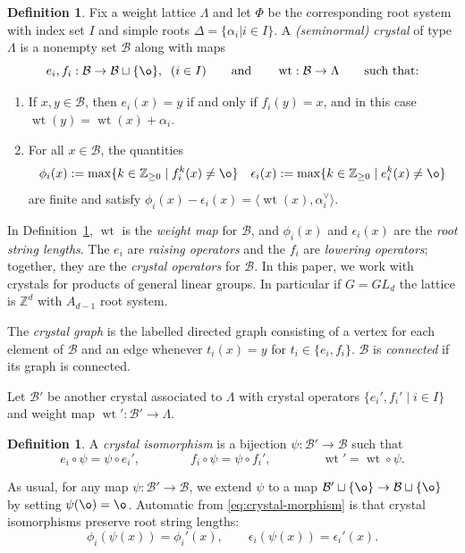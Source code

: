 \documentclass[12pt]{amsart}
\DeclareMathOperator{\wt}{wt}
\theoremstyle{definition}
\newtheorem{definition}[theorem]{Definition}
\theoremstyle{remark}
\begin{document}
\begin{definition} \label{def:crystal}
Fix a weight lattice $\Lambda$ and let $\Phi$ be the corresponding root system with index set $I$ and simple roots $\Delta = \{\alpha_i | i\in I\}$. A \emph{(seminormal) crystal} of type $\Lambda$ is a nonempty set $\mathcal{B}$ along with maps
\[
e_i,f_i: \mathcal{B}\to \mathcal{B}\sqcup \{\o\},\;\; (i\in I) \qquad \text{and}\qquad 
\wt: \mathcal{B}\to\Lambda \qquad \text{such that:}
\]
\begin{enumerate}
\item[(a)] If $x,y\in\mathcal{B}$, then $e_i(x)=y$ if and only if $f_i(y) = x$, and in this case $\wt(y) = \wt(x) + \alpha_i$.
\item[(b)] For all $x\in\mathcal{B}$, the quantities
\[
\phi_i(x) := \max\{ k\in\mathbb{Z}_{\ge 0} \;|\; f_i^k(x)\ne \o\} \quad \epsilon_i(x) := \max\{ k\in\mathbb{Z}_{\ge 0} \;|\; e_i^k(x)\ne \o\}
\]
are finite and satisfy $\phi_i(x) - \epsilon_i(x) = \langle \wt(x), \alpha_i^\vee\rangle$.
\end{enumerate}
\end{definition}

In Definition~\ref{def:crystal},
$\wt$ is the \emph{weight map} for $\mathcal{B}$, and $\phi_i(x)$ and $\epsilon_i(x)$ are the \emph{root string lengths}. The $e_i$ are \emph{raising operators} and the $f_i$ are \emph{lowering operators}; together, they are the \emph{crystal operators} for $\mathcal{B}$.
In this paper, we work with crystals for products of general linear groups. In particular if $G=GL_d$ the lattice is ${\mathbb Z}^d$ with $A_{d-1}$ root system.

The \emph{crystal graph} is the labelled directed graph consisting of a vertex for each element of $\mathcal{B}$ and an edge
whenever $t_i(x) = y$ for $t_i\in\{e_i,f_i\}$. $\mathcal{B}$ is \emph{connected} if its graph is connected.

Let $\mathcal{B}'$ be another crystal associated to $\Lambda$ with crystal operators $\{e_i',f_i' \;|\; i\in I\}$ and weight map $\wt':\mathcal{B}'\to\Lambda$. 
\begin{definition}
A \emph{crystal isomorphism} is a bijection $\psi: \mathcal{B}'\to\mathcal{B}$ such that
\begin{equation} \label{eq:crystal-morphism}
e_i\circ\psi = \psi \circ e_i', \qquad\qquad f_i\circ\psi = \psi \circ f_i', \qquad\qquad \wt' = \wt\circ\psi.
\end{equation}
\end{definition}
As usual, for any map $\psi:\mathcal B'\to\mathcal B$, we extend $\psi$ to a map
$\mathcal B'\sqcup\{\o\}\to\mathcal B\sqcup\{\o\}$ by setting $\psi(\o)=\o$.
Automatic from \eqref{eq:crystal-morphism} is that crystal isomorphisms preserve root string lengths: 
\begin{equation}\label{eqn:July29aaa}
\phi_i(\psi(x))=\phi_i'(x), \qquad \epsilon_i(\psi(x))=\epsilon_i'(x).
\end{equation}
\end{document}
